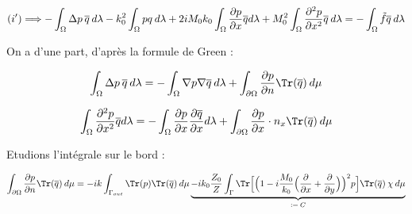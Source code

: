 \begin{equation}
    (i') \Longrightarrow -\int_{\Omega} \Delta p \hspace{2pt} \overline{q}\hspace{2pt} d\lambda -k_0^2 \int_{\Omega} pq\hspace{2pt} d\lambda +2iM_0 k_0\int_{\Omega} \frac{\partial p}{\partial x}\overline{q} d\lambda +M_0 ^2 \int_{\Omega} \frac{\partial^2 p}{\partial x^2} \overline{q}\hspace{2pt} d\lambda = -\int_{\Omega} \Tilde{f}\overline{q}\hspace{2pt} d\lambda
\end{equation}

On a d'une part, d'après la formule de Green :

\begin{equation}
    \int_{\Omega} \Delta p\hspace{2pt} \overline{q}\hspace{2pt} d\lambda=-\int_{\Omega} \nabla p \nabla \overline{q}\hspace{2pt} d\lambda + \int_{\partial \Omega} \frac{\partial p}{\partial n} \Tr(\overline{q}) \hspace{2pt} d\mu
\end{equation}


\begin{equation}
    \int_{\Omega} \frac{\partial^2 p}{\partial x^2}\overline{q} d\lambda = -\int_{\Omega} \frac{\partial p}{\partial x} \frac{\partial \overline{q}}{\partial x}d\lambda + \int_{\partial \Omega} \frac{\partial p}{\partial x} \cdot n_x \Tr(\overline{q})\hspace{2pt} d\mu
\end{equation}



Etudions l'intégrale sur le bord :

\begin{equation}
    \int_{\partial \Omega} \frac{\partial p}{\partial n} \Tr(\overline{q}) \hspace{2pt} d\mu = 
    -i k \int_{\Gamma_{out}} \Tr(p) \Tr(\overline{q})\hspace{2pt} d\mu \underbrace{-ik_0 \frac{Z_0}{Z}\int_{\Gamma} \Tr \Bigl[ \Bigl(1-i \frac{M_0}{k_0} \Big(\frac{\partial}{\partial x} + \frac{\partial}{\partial y}\Big) \Bigr)^2p \Bigr] \Tr(\overline{q}) \hspace{2pt} \chi \hspace{2pt} d\mu}_{:= \hspace{2pt} C}
\end{equation}



